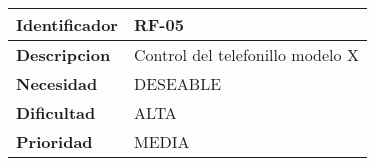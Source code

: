 \begin{center}
    \begin{tabular}{|p{2.6cm}|p{12cm}|}
    \hline
    \textbf{Identificador} & RF-05\\
    \hline
    \textbf{Descripcion} & Control del telefonillo modelo X\\
    \hline
    \textbf{Necesidad} & DESEABLE\\
    \hline
    \textbf{Dificultad} & ALTA\\
    \hline
    \textbf{Prioridad} & MEDIA\\
    \hline
    \end{tabular}
\end{center}

